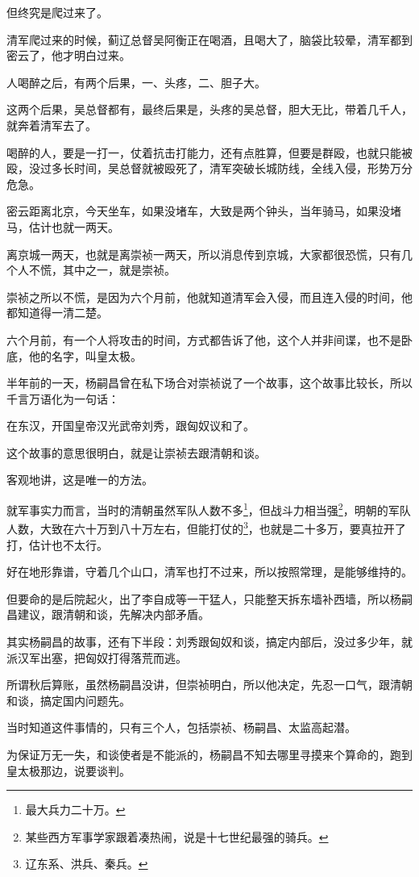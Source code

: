 \begin{multicols}{\theparacolNo}
		但终究是爬过来了。

		清军爬过来的时候，蓟辽总督吴阿衡正在喝酒，且喝大了，脑袋比较晕，清军都到密云了，他才明白过来。

		人喝醉之后，有两个后果，一、头疼，二、胆子大。

		这两个后果，吴总督都有，最终后果是，头疼的吴总督，胆大无比，带着几千人，就奔着清军去了。

		喝醉的人，要是一打一，仗着抗击打能力，还有点胜算，但要是群殴，也就只能被殴，没过多长时间，吴总督就被殴死了，清军突破长城防线，全线入侵，形势万分危急。

		密云距离北京，今天坐车，如果没堵车，大致是两个钟头，当年骑马，如果没堵马，估计也就一两天。

		离京城一两天，也就是离崇祯一两天，所以消息传到京城，大家都很恐慌，只有几个人不慌，其中之一，就是崇祯。

		崇祯之所以不慌，是因为六个月前，他就知道清军会入侵，而且连入侵的时间，他都知道得一清二楚。

		六个月前，有一个人将攻击的时间，方式都告诉了他，这个人并非间谍，也不是卧底，他的名字，叫皇太极。

		半年前的一天，杨嗣昌曾在私下场合对崇祯说了一个故事，这个故事比较长，所以千言万语化为一句话：

		在东汉，开国皇帝汉光武帝刘秀，跟匈奴议和了。

		这个故事的意思很明白，就是让崇祯去跟清朝和谈。

		客观地讲，这是唯一的方法。

		就军事实力而言，当时的清朝虽然军队人数不多\footnote{最大兵力二十万。}，但战斗力相当强\footnote{某些西方军事学家跟着凑热闹，说是十七世纪最强的骑兵。}，明朝的军队人数，大致在六十万到八十万左右，但能打仗的\footnote{辽东系、洪兵、秦兵。}，也就是二十多万，要真拉开了打，估计也不太行。

		好在地形靠谱，守着几个山口，清军也打不过来，所以按照常理，是能够维持的。

		但要命的是后院起火，出了李自成等一干猛人，只能整天拆东墙补西墙，所以杨嗣昌建议，跟清朝和谈，先解决内部矛盾。

		其实杨嗣昌的故事，还有下半段：刘秀跟匈奴和谈，搞定内部后，没过多少年，就派汉军出塞，把匈奴打得落荒而逃。

		所谓秋后算账，虽然杨嗣昌没讲，但崇祯明白，所以他决定，先忍一口气，跟清朝和谈，搞定国内问题先。

		当时知道这件事情的，只有三个人，包括崇祯、杨嗣昌、太监高起潜。

		为保证万无一失，和谈使者是不能派的，杨嗣昌不知去哪里寻摸来个算命的，跑到皇太极那边，说要谈判。


\end{multicols}
